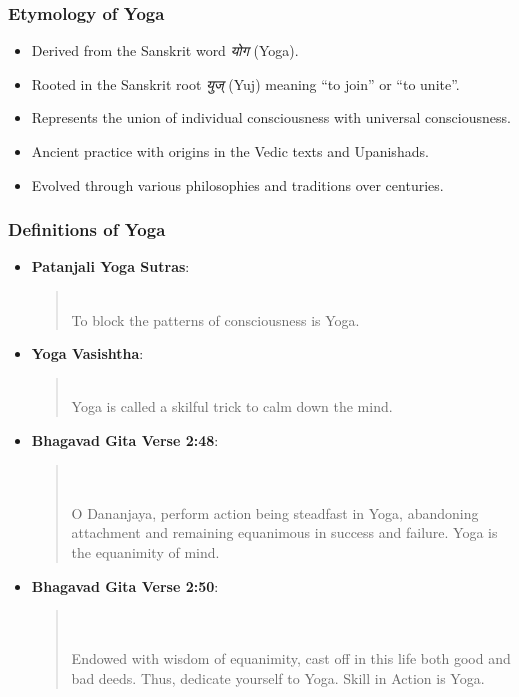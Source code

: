 \begin{frame}[fragile]\frametitle{Etymology of Yoga}

      \begin{itemize}
		\item Derived from the Sanskrit word \textit{योग} (Yoga).
		\item Rooted in the Sanskrit root \textit{युज्} (Yuj) meaning “to join” or “to unite”.
		\item Represents the union of individual consciousness with universal consciousness.
		\item Ancient practice with origins in the Vedic texts and Upanishads.
		\item Evolved through various philosophies and traditions over centuries.
	  \end{itemize}

\end{frame}

\begin{frame}[fragile]\frametitle{Definitions of Yoga}
      \begin{itemize}
        \item \textbf{Patanjali Yoga Sutras}:
          \begin{quote}
           \\
          To block the patterns of consciousness is Yoga.
          \end{quote}
        \item \textbf{Yoga Vasishtha}:
          \begin{quote}
           \\
          Yoga is called a skilful trick to calm down the mind.
          \end{quote}
        \item \textbf{Bhagavad Gita Verse 2:48}:
          \begin{quote}
          \\
          \\
          O Dananjaya, perform action being steadfast in Yoga, abandoning attachment and remaining equanimous in success and failure. Yoga is the equanimity of mind.
          \end{quote}
        \item \textbf{Bhagavad Gita Verse 2:50}:
          \begin{quote}
          \\
          \\
          Endowed with wisdom of equanimity, cast off in this life both good and bad deeds. Thus, dedicate yourself to Yoga. Skill in Action is Yoga.
          \end{quote}
      \end{itemize}
\end{frame}


